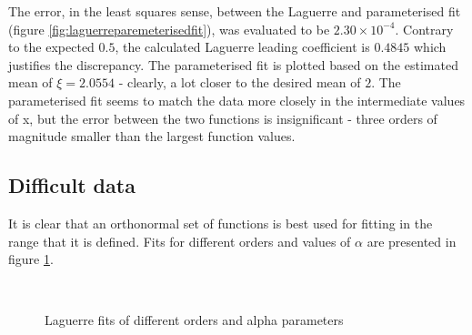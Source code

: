\documentclass[a4paper]{article}
\numberwithin{equation}{section}
\begin{document}
\noindent The error, in the least squares sense, between the Laguerre and parameterised fit (figure \ref{fig:laguerreparemeterisedfit}), was evaluated to be $2.30 \times 10^{-4}$. Contrary to the expected $0.5$, the calculated Laguerre leading coefficient is $0.4845$ which justifies the discrepancy. The parameterised fit is plotted based on the estimated mean of $\xi=2.0554$ - clearly, a lot closer to the desired mean of $2$. The parameterised fit seems to match the data more closely in the intermediate values of x, but the error between the two functions is insignificant - three orders of magnitude smaller than the largest function values.  

\subsection{Difficult data}
It is clear that an orthonormal set of functions is best used for fitting in the range that it is defined. Fits for different orders and values of $\alpha$ are presented in figure \ref{fig:difficultfits}.

\begin{figure}[!ht]
  \centering
  \quad
  \\
  \quad
  \caption{Laguerre fits of different orders and alpha parameters}
  \label{fig:difficultfits}
\end{figure}
\end{document}
